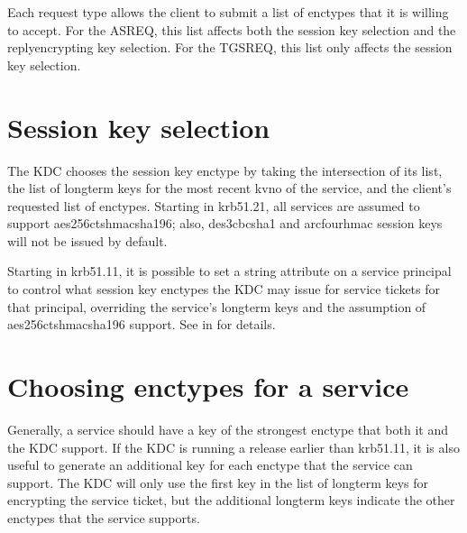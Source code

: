\documentclass[letterpaper,10pt,english]{sphinxmanual}
\begin{document}
\sphinxAtStartPar
Each request type allows the client to submit a list of enctypes that
it is willing to accept.  For the AS\sphinxhyphen{}REQ, this list affects both the
session key selection and the reply\sphinxhyphen{}encrypting key selection.  For the
TGS\sphinxhyphen{}REQ, this list only affects the session key selection.


\section{Session key selection}
\label{\detokenize{admin/enctypes:session-key-selection}}\label{\detokenize{admin/enctypes:id1}}
\sphinxAtStartPar
The KDC chooses the session key enctype by taking the intersection of
its  list, the list of long\sphinxhyphen{}term keys for the
most recent kvno of the service, and the client’s requested list of
enctypes.  Starting in krb5\sphinxhyphen{}1.21, all services are assumed to support
aes256\sphinxhyphen{}cts\sphinxhyphen{}hmac\sphinxhyphen{}sha1\sphinxhyphen{}96; also, des3\sphinxhyphen{}cbc\sphinxhyphen{}sha1 and arcfour\sphinxhyphen{}hmac session
keys will not be issued by default.

\sphinxAtStartPar
Starting in krb5\sphinxhyphen{}1.11, it is possible to set a string attribute on a
service principal to control what session key enctypes the KDC may
issue for service tickets for that principal, overriding the service’s
long\sphinxhyphen{}term keys and the assumption of aes256\sphinxhyphen{}cts\sphinxhyphen{}hmac\sphinxhyphen{}sha1\sphinxhyphen{}96 support.
See {\hyperref[\detokenize{admin/admin_commands/kadmin_local:set-string}]{}} in {\hyperref[\detokenize{admin/admin_commands/kadmin_local:kadmin-1}]{}} for details.


\section{Choosing enctypes for a service}
\label{\detokenize{admin/enctypes:choosing-enctypes-for-a-service}}
\sphinxAtStartPar
Generally, a service should have a key of the strongest
enctype that both it and the KDC support.  If the KDC is running a
release earlier than krb5\sphinxhyphen{}1.11, it is also useful to generate an
additional key for each enctype that the service can support.  The KDC
will only use the first key in the list of long\sphinxhyphen{}term keys for encrypting
the service ticket, but the additional long\sphinxhyphen{}term keys indicate the
other enctypes that the service supports.
\end{document}
